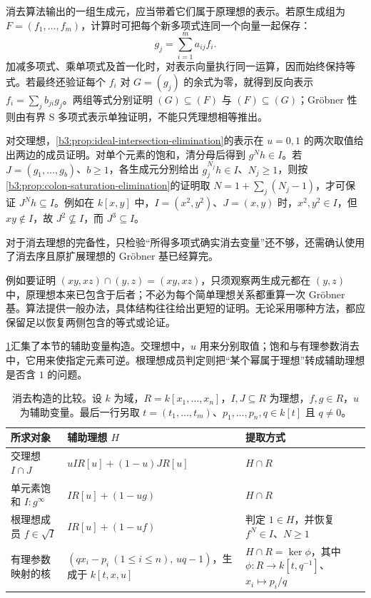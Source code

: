 消去算法输出的一组生成元，应当带着它们属于原理想的表示。若原生成组为 \(F=(f_1,\ldots,f_m)\)，计算时可把每个新多项式连同一个向量一起保存：
\[
	g_j=\sum_{i=1}^m a_{ij}f_i.
\]
加减多项式、乘单项式及首一化时，对表示向量执行同一运算，因而始终保持等式。若最终还验证每个 \(f_i\) 对 \(G=(g_j)\) 的余式为零，就得到反向表示 \(f_i=\sum_j b_{ji}g_j\)。两组等式分别证明 \((G)\subseteq(F)\) 与 \((F)\subseteq(G)\)；Gröbner 性则由有界 S 多项式表示单独证明，不能只凭理想相等推出。

\ProseParagraphBreak
对交理想，\cref{b3:prop:ideal-intersection-elimination}的表示在 \(u=0,1\) 的两次取值给出两边的成员证明。对单个元素的饱和，清分母后得到 \(g^Nh\in I\)。若 \(J=(g_1,\ldots,g_b)\)、\(b\ge1\)，各生成元分别给出 \(g_j^{N_j}h\in I\)、\(N_j\ge1\)，则按\cref{b3:prop:colon-saturation-elimination}的证明取 \(N=1+\sum_j(N_j-1)\)，才可保证 \(J^Nh\subseteq I\)。例如在 \(k[x,y]\) 中，\(I=(x^2,y^2)\)、\(J=(x,y)\) 时，\(x^2,y^2\in I\)，但 \(xy\notin I\)，故 \(J^2\not\subseteq I\)，而 \(J^3\subseteq I\)。

\ProseParagraphBreak
对于消去理想的完备性，只检验“所得多项式确实消去变量”还不够，还需确认使用了消去序且原扩展理想的 Gröbner 基已经算完。

\ProseParagraphBreak
例如要证明 \((xy,xz)\cap(y,z)=(xy,xz)\)，只须观察两生成元都在 \((y,z)\) 中，原理想本来已包含于后者；不必为每个简单理想关系都重算一次 Gröbner 基。算法提供一般办法，具体结构往往给出更短的证明。无论采用哪种方法，都应保留足以恢复两侧包含的等式或论证。

\ProseParagraphBreak
\cref{b3:tab:elimination-constructions}汇集了本节的辅助变量构造。交理想中，\(u\) 用来分别取值；饱和与有理参数消去中，它用来使指定元素可逆。根理想成员判定则把“某个幂属于理想”转成辅助理想是否含 \(1\) 的问题。

\begin{table}[htbp]
	\centering
	\caption[消去构造的比较]{消去构造的比较。设 \(k\) 为域，\(R=k[x_1,\ldots,x_n]\)，\(I,J\subseteq R\) 为理想，\(f,g\in R\)，\(u\) 为辅助变量。最后一行另取 \(t=(t_1,\ldots,t_m)\)、\(p_1,\ldots,p_n,q\in k[t]\) 且 \(q\ne0\)。}
	\label{b3:tab:elimination-constructions}
	\begin{tabularx}{\textwidth}{@{}>{\raggedright\arraybackslash}p{}>{\raggedright\arraybackslash}X>{\raggedright\arraybackslash}p{}@{}}
		\toprule
		所求对象 & 辅助理想 \(H\) & 提取方式 \\
		\midrule
		交理想 \(I\cap J\) & \(uIR[u]+(1-u)JR[u]\) & \(H\cap R\) \\
		单元素饱和 \(I:g^\infty\) & \(IR[u]+(1-ug)\) & \(H\cap R\) \\
		根理想成员 \(f\in\sqrt I\) & \(IR[u]+(1-uf)\) & 判定 \(1\in H\)，并恢复 \(f^N\in I\)、\(N\ge1\) \\
		有理参数映射的核 & \((qx_i-p_i\ (1\le i\le n),\,uq-1)\)，生成于 \(k[t,x,u]\) & \(H\cap R=\ker\phi\)，其中 \(\phi:R\to k[t,q^{-1}]\)、\(x_i\mapsto p_i/q\) \\
		\bottomrule
	\end{tabularx}
\end{table}
